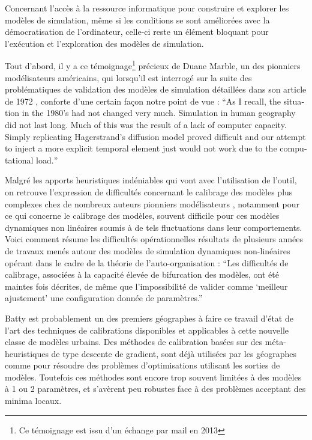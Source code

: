 Concernant l'accès à la ressource informatique pour construire et explorer les modèles de simulation, même si les conditions se sont améliorées avec la démocratisation de l'ordinateur, celle-ci reste un élément bloquant pour l'exécution et l'exploration des modèles de simulation.

Tout d'abord, il y a ce témoignage\footnote{Ce témoignage est issu d'un échange par mail en 2013} précieux de Duane Marble, un des pionniers modélisateurs américains, qui lorsqu'il est interrogé sur la suite des problématiques de validation des modèles de simulation détaillées dans son article de 1972 \autocite{Marble1972}, conforte d'une certain façon notre point de vue : \foreignquote{english}{As I recall, the situation in the 1980's had not changed very much. Simulation in human geography did not last long. Much of this was the result of a lack of computer capacity. Simply replicating Hagerstrand's diffusion model proved difficult and our attempt to inject a more explicit temporal element just would not work due to the computational load.}

Malgré les apports heuristiques indéniables qui vont avec l'utilisation de l'outil, on retrouve l'expression de difficultés concernant le calibrage des modèles plus complexes chez de nombreux auteurs pionniers modélisateurs \autocites{Batty1976, Pumain1998a}[400]{Sanders1984}, notamment pour ce qui concerne le calibrage des modèles, souvent difficile pour ces modèles dynamiques non linéaires soumis à de tels fluctuations dans leur comportements. Voici comment \autocite{Pumain1998a} résume les difficultés opérationnelles résultats de plusieurs années de travaux menés autour des modèles de simulation dynamiques non-linéaires opérant dans le cadre de la théorie de l'auto-organisation : \enquote{Les difficultés de calibrage, associées à la capacité élevée de bifurcation des modèles, ont été maintes fois décrites, de même que l’impossibilité de valider comme \enquote{meilleur ajustement} une configuration donnée de paramètres.}

Batty est probablement un des premiers géographes à faire ce travail d'état de l'art des techniques de calibrations disponibles et applicables à cette nouvelle classe de modèles urbains. Des méthodes de calibration basées sur des méta-heuristiques de type descente de gradient, sont déjà utilisées par les géographes comme \textcite[159]{Batty1976} pour résoudre des problèmes d'optimisations utilisant les sorties de modèles. Toutefois ces méthodes sont encore trop souvent limitées à des modèles à 1 ou 2 paramètres, et s'avèrent peu robustes face à des problèmes acceptant des minima locaux. 

